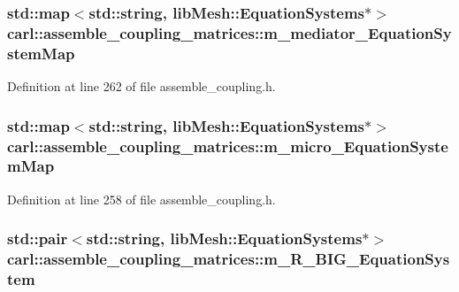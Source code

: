 \subsubsection[{m\+\_\+mediator\+\_\+\+Equation\+System\+Map}]{\setlength{\rightskip}{0pt plus 5cm}std\+::map$<$std\+::string, lib\+Mesh\+::\+Equation\+Systems$\ast$$>$ carl\+::assemble\+\_\+coupling\+\_\+matrices\+::m\+\_\+mediator\+\_\+\+Equation\+System\+Map\hspace{0.3cm}{\ttfamily [protected]}}\label{classcarl_1_1assemble__coupling__matrices_a9d61d2378c5658d6cfc7fa0d2ef306a5}


Definition at line 262 of file assemble\+\_\+coupling.\+h.

\hypertarget{classcarl_1_1assemble__coupling__matrices_a13fddbcb853df9b7ce1a99062fb9f8b6}{}
\subsubsection[{m\+\_\+micro\+\_\+\+Equation\+System\+Map}]{\setlength{\rightskip}{0pt plus 5cm}std\+::map$<$std\+::string, lib\+Mesh\+::\+Equation\+Systems$\ast$$>$ carl\+::assemble\+\_\+coupling\+\_\+matrices\+::m\+\_\+micro\+\_\+\+Equation\+System\+Map\hspace{0.3cm}{\ttfamily [protected]}}\label{classcarl_1_1assemble__coupling__matrices_a13fddbcb853df9b7ce1a99062fb9f8b6}


Definition at line 258 of file assemble\+\_\+coupling.\+h.

\hypertarget{classcarl_1_1assemble__coupling__matrices_ac8e2172182aa563e854e7b693344b301}{}
\subsubsection[{m\+\_\+\+R\+\_\+\+B\+I\+G\+\_\+\+Equation\+System}]{\setlength{\rightskip}{0pt plus 5cm}std\+::pair$<$std\+::string, lib\+Mesh\+::\+Equation\+Systems$\ast$$>$ carl\+::assemble\+\_\+coupling\+\_\+matrices\+::m\+\_\+\+R\+\_\+\+B\+I\+G\+\_\+\+Equation\+System\hspace{0.3cm}{\ttfamily [protected]}}\label{classcarl_1_1assemble__coupling__matrices_ac8e2172182aa563e854e7b693344b301}


